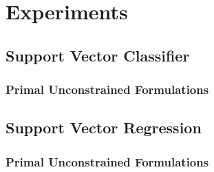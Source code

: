 \section{Experiments}

\subsection{Support Vector Classifier}

\subsubsection{Primal Unconstrained Formulations}

% 

% 

\subsection{Support Vector Regression}

\subsubsection{Primal Unconstrained Formulations}